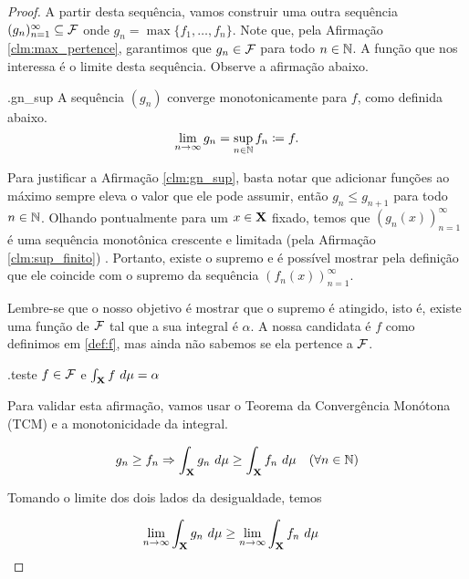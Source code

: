 \begin{proof}
    A partir desta sequência, vamos construir uma outra sequência $(g_n)_{n=1}^{\infty}\subseteq \mathcal{F}$ onde $g_n=\max\{f_1,\dots, f_n\}$. Note que, pela Afirmação \ref{clm:max_pertence}, garantimos que $g_n\in\mathcal{F}$ para todo $n\in\mathbb{N}$. A função que nos interessa é o limite desta sequência. Observe a afirmação abaixo.

    \begin{claim}{.}{gn_sup}
    A sequência $(g_n)$ converge monotonicamente para $f$, como definida abaixo.
        \begin{equation}\label{def:f}
            \lim_{n\to\infty} g_n = \sup_{n\in\mathbb{N}} f_n \coloneq f.
        \end{equation}
    \end{claim}

    Para justificar a Afirmação \ref{clm:gn_sup}, basta notar que adicionar funções ao máximo sempre eleva o valor que ele pode assumir, então $g_n\leq g_{n+1}$ para todo $n\in\mathbb{N}$. Olhando pontualmente para um $x\in\mathbf{X}$ fixado, temos que $(g_n(x))_{n=1}^{\infty}$ é uma sequência monotônica crescente e limitada (pela Afirmação \ref{clm:sup_finito}) . Portanto, existe o supremo e é possível mostrar pela definição que ele coincide com o supremo da sequência $(f_n(x))_{n=1}^{\infty}$.

    Lembre-se que o nosso objetivo é mostrar que o supremo é atingido, isto é, existe uma função de $\mathcal{F}$ tal que a sua integral é $\alpha$. A nossa candidata é $f$ como definimos em \eqref{def:f}, mas ainda não sabemos se ela pertence a $\mathcal{F}$.

    \begin{claim}{.}{teste}
        $f\in\mathcal{F}$ e $\int_{\mathbf{X}} f \ d\mu = \alpha$
    \end{claim}

    Para validar esta afirmação, vamos usar o Teorema da Convergência Monótona (TCM) e a monotonicidade da integral.

    \begin{equation*}
        g_n \geq f_n \Rightarrow \int_{\X} g_n \ d\mu \geq \int_{\X} f_n \ d\mu \quad (\forall n\in\N)
    \end{equation*}

    Tomando o limite dos dois lados da desigualdade, temos

    \begin{equation*}
        \lim_{n\to\infty} \int_{\mathbf{X}} g_n \ d\mu \geq \lim_{n\to\infty}  \int_{\mathbf{X}} f_n \ d\mu \quad
    \end{equation*}


\end{proof}
